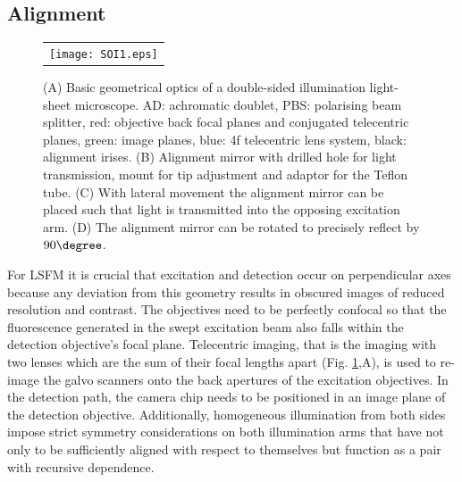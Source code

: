 \documentclass[12pt]{spieman}  %
\begin{document}
\begin{spacing}{2}
\subsection{Alignment}

\begin{figure}
   \begin{center}
   \begin{tabular}{c}
   \texttt{[image: SOI1.eps]}
   \end{tabular}
   \end{center}
   \caption{\label{fig:alignment} (A) Basic geometrical optics of a double-sided illumination light-sheet microscope. AD: achromatic doublet, PBS: polarising beam splitter, red: objective back focal planes and conjugated telecentric planes, green: image planes, blue: 4f telecentric lens system, black: alignment irises. (B) Alignment mirror with drilled hole for light transmission, mount for tip adjustment and adaptor for the Teflon tube. (C) With lateral movement the alignment mirror can be placed such that light is transmitted into the opposing excitation arm. (D) The alignment mirror can be rotated to precisely reflect by $90\degree$.} 
   \end{figure}

For LSFM it is crucial that excitation and detection occur on perpendicular axes because any deviation from this geometry results in obscured images of reduced resolution and contrast. The objectives need to be perfectly confocal so that the fluorescence generated in the swept excitation beam also falls within the detection objective's focal plane. Telecentric imaging, that is the imaging with two lenses which are the sum of their focal lengths apart (Fig. \ref{fig:alignment},A), is used to re-image the galvo scanners onto the back apertures of the excitation objectives. In the detection path, the camera chip needs to be positioned in an image plane of the detection objective. Additionally, homogeneous illumination from both sides impose strict symmetry considerations on both illumination arms that have not only to be sufficiently aligned with respect to themselves but function as a pair with recursive dependence. 


\end{spacing}
\end{document}
